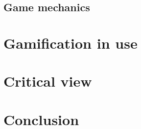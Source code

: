\documentclass[10pt,twoside,english,a4paper]{article}
\begin{document}
\subsection{Game mechanics} \label{section3.2}



\section{Gamification in use} \label{section4}



\section{Critical view} \label{section5}



\section{Conclusion} \label{section6}





\end{document}
